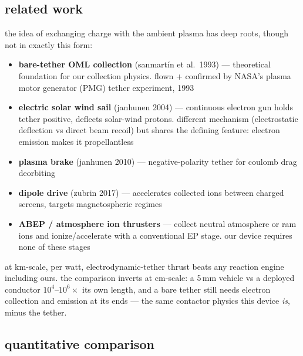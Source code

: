 \documentclass[11pt]{article}
\begin{document}
\subsection{related work}

the idea of exchanging charge with the ambient plasma has deep roots, though
not in exactly this form:

\begin{itemize}
  \item \textbf{bare-tether OML collection} (sanmart\'in et al.\ 1993) ---
        theoretical foundation for our collection physics.  flown + confirmed
        by NASA's plasma motor generator (PMG) tether experiment, 1993
  \item \textbf{electric solar wind sail} (janhunen 2004) --- continuous
        electron gun holds tether positive, deflects solar-wind protons.
        different mechanism (electrostatic deflection vs direct beam recoil)
        but shares the defining feature: electron emission makes it
        propellantless
  \item \textbf{plasma brake} (janhunen 2010) --- negative-polarity tether for
        coulomb drag deorbiting
  \item \textbf{dipole drive} (zubrin 2017) --- accelerates collected ions
        between charged screens, targets magnetospheric regimes
  \item \textbf{ABEP / atmosphere ion thrusters} --- collect neutral atmosphere
        or ram ions and ionize/accelerate with a conventional EP stage.  our
        device requires none of these stages
\end{itemize}

at km-scale, per watt, electrodynamic-tether thrust beats any reaction engine
including ours.  the comparison inverts at cm-scale: a 5\,mm vehicle vs a
deployed conductor $10^4$--$10^6\times$ its own length, and a bare tether
still needs electron collection and emission at its ends --- the same
contactor physics this device \emph{is}, minus the tether.

\subsection{quantitative comparison}
\end{document}
